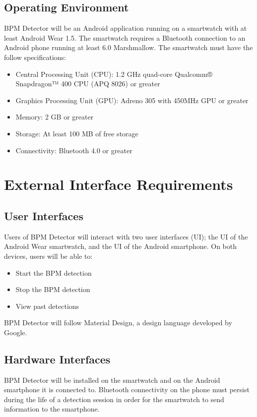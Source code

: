 \documentclass[12pt]{article}
\begin{document}
\subsection{Operating Environment}
BPM Detector will be an Android application running on a smartwatch with at least Android Wear 1.5. The smartwatch requires a Bluetooth connection to an Android phone running at least 6.0 Marshmallow. The smartwatch must have the follow specifications:
\begin{itemize}
	\item Central Processing Unit (CPU): 1.2 GHz quad-core Qualcomm® Snapdragon™ 400 CPU (APQ 8026) or greater
    \item Graphics Processing Unit (GPU): Adreno 305 with 450MHz GPU or greater
    \item Memory: 2 GB or greater
    \item Storage: At least 100 MB of free storage
    \item Connectivity: Bluetooth 4.0 or greater
 \end{itemize}
 
 

\section{External Interface Requirements}
\subsection{User Interfaces}
Users of BPM Detector will interact with two user interfaces (UI); the UI of the Android Wear smartwatch, and the UI of the Android smartphone. On both devices, users will be able to:
\begin{itemize}
	\item Start the BPM detection
    \item Stop the BPM detection
    \item View past detections
 \end{itemize}
 BPM Detector will follow Material Design, a design language developed by Google. 

\subsection{Hardware Interfaces}
BPM Detector will be installed on the smartwatch and on the Android smartphone it is connected to. Bluetooth connectivity on the phone must persist during the life of a detection session in order for the smartwatch to send information to the smartphone. 
\end{document}
